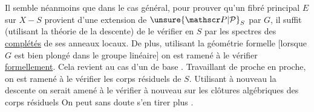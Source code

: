 Il semble néanmoins que dans le cas général, pour prouver qu’un fibré principal $E$ sur $X-S$ provient d’une  extension de $\unsure{\mathscr P|\mathcal P}_S$ par $G$, il suffit (utilisant la théorie de la descente) de le vérifier en  $S$ par les spectres des \uline{complétés} de ses anneaux locaux.
De plus, utilisant la géométrie formelle [lorsque $G$ est bien plongé dans le groupe  linéaire] on est ramené à le vérifier \uline{formellement}.
Cela revient au cas d’un  de base . Travaillant de proche en proche, on est ramené à le vérifier  \uline{} les corps résiduels de $S$.
Utilisant à nouveau la descente on serait amené à le vérifier à nouveau sur les clôtures algébriques des corps résiduels On peut sans doute s’en tirer plus .
